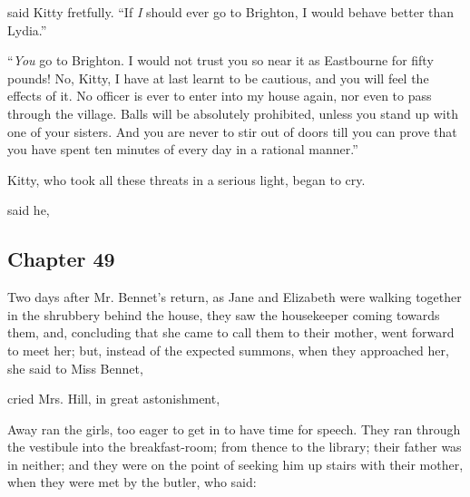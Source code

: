  said Kitty fretfully. “If {\em I} should ever go to Brighton, I would behave better than Lydia.”

“{\em You} go to Brighton. I would not trust you so near it as Eastbourne for fifty pounds! No, Kitty, I have at last learnt to be cautious, and you will feel the effects of it. No officer is ever to enter into my house again, nor even to pass through the village. Balls will be absolutely prohibited, unless you stand up with one of your sisters. And you are never to stir out of doors till you can prove that you have spent ten minutes of every day in a rational manner.”

Kitty, who took all these threats in a serious light, began to cry.

 said he, 

\subsection[chapter-49]{\useURL[url49][][][]\from[url49] Chapter 49}

Two days after Mr. Bennet's return, as Jane and Elizabeth were walking together in the shrubbery behind the house, they saw the housekeeper coming towards them, and, concluding that she came to call them to their mother, went forward to meet her; but, instead of the expected summons, when they approached her, she said to Miss Bennet, 


 cried Mrs. Hill, in great astonishment, 

Away ran the girls, too eager to get in to have time for speech. They ran through the vestibule into the breakfast-room; from thence to the library; their father was in neither; and they were on the point of seeking him up stairs with their mother, when they were met by the butler, who said:


